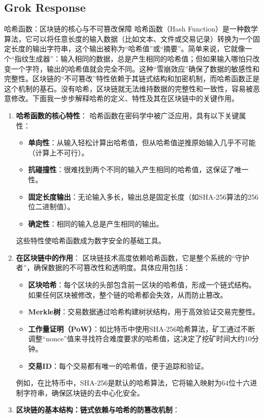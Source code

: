 \documentclass[a4paper,12pt]{ctexart}
\begin{document}
\subsection*{Grok Response}
哈希函数：区块链的核心与不可篡改保障
哈希函数（Hash Function）是一种数学算法，它可以将任意长度的输入数据（比如文本、文件或交易记录）转换为一个固定长度的输出字符串，这个输出被称为“哈希值”或“摘要”。简单来说，它就像一个“指纹生成器”：输入相同的数据，总是产生相同的哈希值；但如果输入哪怕只改变一个字符，输出的哈希值就会完全不同。这种“雪崩效应”确保了数据的敏感性和完整性。区块链的“不可篡改”特性依赖于其链式结构和加密机制，而哈希函数正是这个机制的基石。没有哈希，区块链就无法维持数据的完整性和一致性，容易被恶意修改。下面我一步步解释哈希的定义、特性及其在区块链中的关键作用。
\begin{enumerate}
\item \textbf{哈希函数的核心特性}：
哈希函数在密码学中被广泛应用，具有以下关键属性：
\begin{itemize}
\item \textbf{单向性}：从输入轻松计算出哈希值，但从哈希值逆推原始输入几乎不可能（计算上不可行）。
\item \textbf{抗碰撞性}：很难找到两个不同的输入产生相同的哈希值，这保证了唯一性。
\item \textbf{固定长度输出}：无论输入多长，输出总是固定长度（如SHA-256算法的256位二进制值）。
\item \textbf{确定性}：相同的输入总是产生相同的输出。
\end{itemize}
这些特性使哈希函数成为数字安全的基础工具。
\item \textbf{在区块链中的作用}：
区块链技术高度依赖哈希函数，它是整个系统的“守护者”，确保数据的不可篡改性和透明度。具体应用包括：
\begin{itemize}
\item \textbf{区块哈希}：每个区块的头部包含前一区块的哈希值，形成一个链式结构。如果任何区块被修改，整个链的哈希都会失效，从而防止篡改。
\item \textbf{Merkle树}：交易数据通过哈希构建树状结构，用于高效验证交易完整性。
\item \textbf{工作量证明（PoW）}：如比特币中使用SHA-256哈希算法，矿工通过不断调整“nonce”值来寻找符合难度要求的哈希值，这决定了挖矿时间大约10分钟。
\item \textbf{交易ID}：每个交易都有唯一的哈希值，便于追踪和验证。
\end{itemize}
例如，在比特币中，SHA-256是默认的哈希算法，它将输入映射为64位十六进制字符串，确保区块链的去中心化安全。
\item \textbf{区块链的基本结构：链式依赖与哈希的防篡改机制}：

\end{enumerate}
\end{document}
